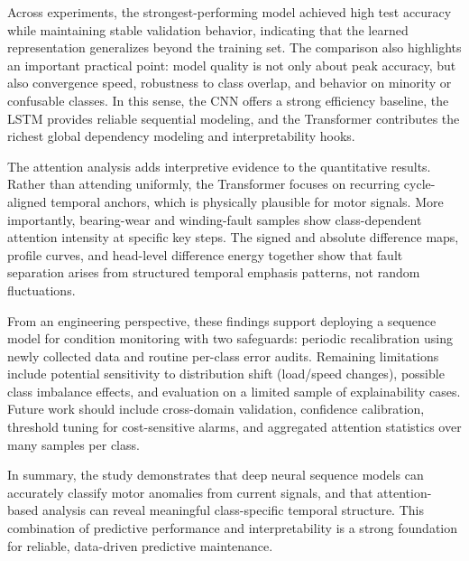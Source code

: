 \documentclass[10pt,twocolumn]{article}
\begin{document}
Across experiments, the strongest-performing model achieved high test accuracy while maintaining stable validation behavior, indicating that the learned representation generalizes beyond the training set. The comparison also highlights an important practical point: model quality is not only about peak accuracy, but also convergence speed, robustness to class overlap, and behavior on minority or confusable classes. In this sense, the CNN offers a strong efficiency baseline, the LSTM provides reliable sequential modeling, and the Transformer contributes the richest global dependency modeling and interpretability hooks.

The attention analysis adds interpretive evidence to the quantitative results. Rather than attending uniformly, the Transformer focuses on recurring cycle-aligned temporal anchors, which is physically plausible for motor signals. More importantly, bearing-wear and winding-fault samples show class-dependent attention intensity at specific key steps. The signed and absolute difference maps, profile curves, and head-level difference energy together show that fault separation arises from structured temporal emphasis patterns, not random fluctuations.

From an engineering perspective, these findings support deploying a sequence model for condition monitoring with two safeguards: periodic recalibration using newly collected data and routine per-class error audits. Remaining limitations include potential sensitivity to distribution shift (load/speed changes), possible class imbalance effects, and evaluation on a limited sample of explainability cases. Future work should include cross-domain validation, confidence calibration, threshold tuning for cost-sensitive alarms, and aggregated attention statistics over many samples per class.

In summary, the study demonstrates that deep neural sequence models can accurately classify motor anomalies from current signals, and that attention-based analysis can reveal meaningful class-specific temporal structure. This combination of predictive performance and interpretability is a strong foundation for reliable, data-driven predictive maintenance.

\nocite{*}




\end{document}
